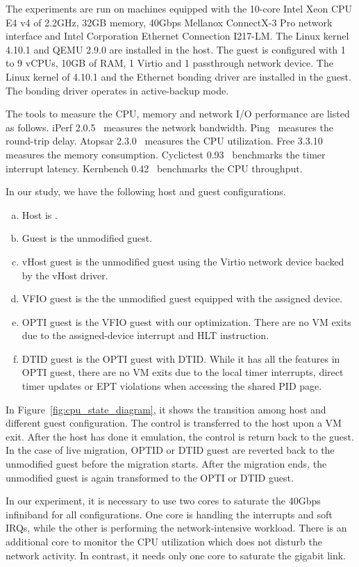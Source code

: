 
The experiments are run on machines equipped with the 10-core
Intel Xeon CPU E4 v4 of 2.2GHz, 32GB memory, 40Gbps Mellanox
ConnectX-3 Pro network interface and Intel Corporation
Ethernet Connection I217-LM. The Linux kernel 4.10.1 and QEMU
2.9.0 are installed in the host. The guest is configured with
1 to 9 vCPUs, 10GB of RAM, 1 Virtio and 1 passthrough network
device. The Linux kernel of 4.10.1 and the Ethernet bonding
driver are installed in the guest. The bonding driver operates
in active-backup mode.

The tools to measure the CPU, memory and network I/O
performance are listed as follows. iPerf 2.0.5~\cite{iperf}
measures the network bandwidth. Ping~\cite{ping} measures the
round-trip delay. Atopsar 2.3.0~\cite{atopsar} measures the
CPU utilization. Free 3.3.10~\cite{free} measures the memory
consumption. Cyclictest 0.93~\cite{cyclictest} benchmarks the
timer interrupt latency. Kernbench 0.42~\cite{kernbench}
benchmarks the CPU throughput.

In our study, we have the following host and guest
configurations.
\begin{enumerate}[(a)]
  \item Host is \na.
  \item Guest is the unmodified guest.
  \item vHost guest is the unmodified guest using the Virtio
  network device backed by the vHost driver.
  \item VFIO guest is the the unmodified guest equipped with
  the assigned device.
  \item OPTI guest is the VFIO guest with our optimization.
  There are no VM exits due to the assigned-device interrupt
  and HLT instruction.
  \item DTID guest is the OPTI guest with DTID. While it has
  all the features in OPTI guest, there are no VM exits due to
  the local timer interrupts, direct timer updates or EPT
  violations when accessing the shared PID page.
\end{enumerate}
In Figure~\ref{fig:cpu_state_diagram}, it shows the transition
among host and different guest configuration. The control is
transferred to the host upon a VM exit. After the host has
done it emulation, the control is return back to the guest. In
the case of live migration, OPTID or DTID guest are reverted
back to the unmodified guest before the migration starts.
After the migration ends, the unmodified guest is again
transformed to the OPTI or DTID guest.

In our experiment, it is necessary to use two cores to
saturate the 40Gbps infiniband for all configurations. One
core is handling the interrupts and soft IRQs, while the other
is performing the network-intensive workload. There is an
additional core to monitor the CPU utilization which does not
disturb the network activity. In contrast, it needs only one
core to saturate the gigabit link.
